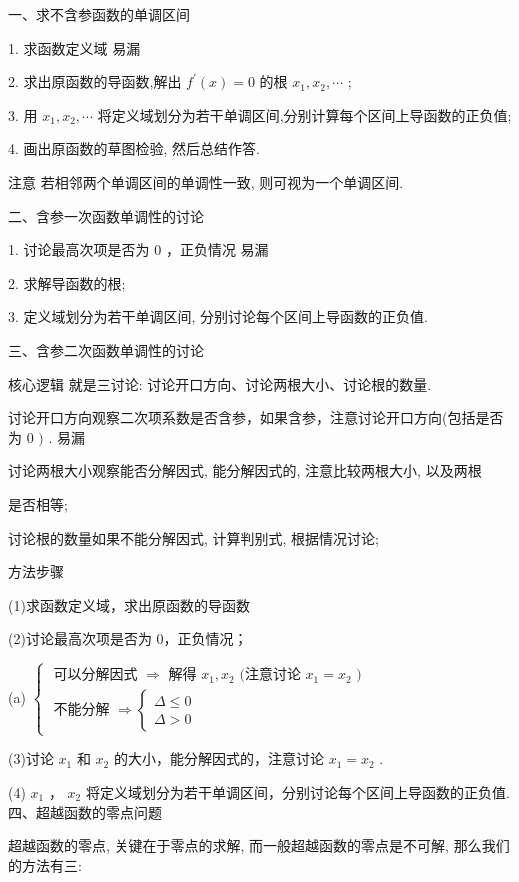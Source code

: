 \documentclass[10pt]{article}
\begin{document}
一、求不含参函数的单调区间

1. 求函数定义域 易漏

2. 求出原函数的导函数,解出 \({f}^{\prime }\left( x\right)  = 0\) 的根 \({x}_{1},{x}_{2},\cdots\) ;

3. 用 \({x}_{1},{x}_{2},\cdots\) 将定义域划分为若干单调区间,分别计算每个区间上导函数的正负值;

4. 画出原函数的草图检验, 然后总结作答.

注意 若相邻两个单调区间的单调性一致, 则可视为一个单调区间.

二、含参一次函数单调性的讨论

1. 讨论最高次项是否为 0 ，正负情况 易漏

2. 求解导函数的根;

3. 定义域划分为若干单调区间, 分别讨论每个区间上导函数的正负值.

三、含参二次函数单调性的讨论

核心逻辑 就是三讨论: 讨论开口方向、讨论两根大小、讨论根的数量.

讨论开口方向观察二次项系数是否含参，如果含参，注意讨论开口方向(包括是否为 0 \()\) . 易漏

讨论两根大小观察能否分解因式, 能分解因式的, 注意比较两根大小, 以及两根

是否相等;

讨论根的数量如果不能分解因式, 计算判别式, 根据情况讨论;

方法步骤

(1)求函数定义域，求出原函数的导函数

(2)讨论最高次项是否为 0，正负情况；

(a) \(\left\{  \begin{array}{l} \text{ 可以分解因式 } \Rightarrow  \text{ 解得 }{x}_{1},{x}_{2}\text{ (注意讨论 }{x}_{1} = {x}_{2}\text{ ) } \\  \text{ 不能分解 } \Rightarrow  \left\{  \begin{array}{l} \Delta  \leq  0 \\  \Delta  > 0 \end{array}\right.  \end{array}\right.\)

(3)讨论 \({x}_{1}\) 和 \({x}_{2}\) 的大小，能分解因式的，注意讨论 \({x}_{1} = {x}_{2}\) .

(4) \({x}_{1}\) ， \({x}_{2}\) 将定义域划分为若干单调区间，分别讨论每个区间上导函数的正负值. 四、超越函数的零点问题

超越函数的零点, 关键在于零点的求解, 而一般超越函数的零点是不可解, 那么我们的方法有三:
\end{document}
